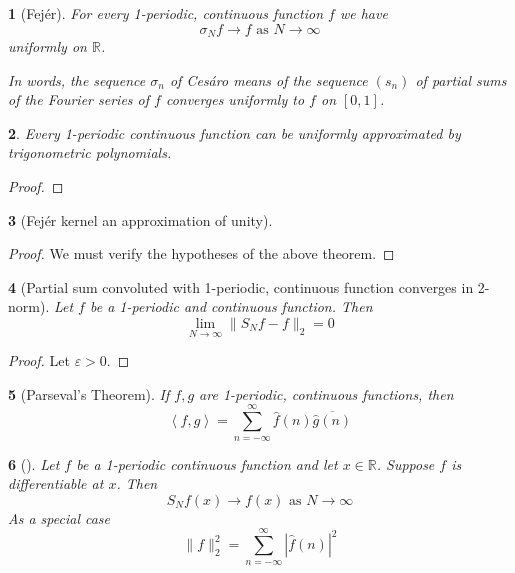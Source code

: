 \documentclass[11pt]{article}
\numberwithin{equation}{section}
\theoremstyle{plain}
\newtheorem{theorem}{\color{ForestGreen}{\textbf{Theorem}}}[section]
\newtheorem{corollary}[theorem]{\color{ForestGreen}{\textbf{Corollary}}}
\theoremstyle{definition}
\newcommand\angles[1]{\left\langle #1 \right\rangle}
\newcommand\abs[1]{\left| #1 \right|}
\newcommand\norm[1]{\lVert#1\rVert}
\newcommand{\1}{\mathbbm 1}
\newcommand{\e}{\varepsilon}
\newcommand{\RR}{\mathbb R}
\begin{document}
\begin{theorem}[Fej\'er]
	For every 1-periodic, continuous function $f$ we have
	\begin{equation}
		\sigma_N f \to f \text{ as } N \to \infty
	\end{equation}
	uniformly on $\RR$. 

	In words, the sequence $\sigma_n$ of Ces\'aro means of the sequence $(s_n)$ of partial sums of the Fourier series of $f$ converges uniformly to $f$ on $[0,1]$.
\end{theorem}

\begin{corollary}
	Every 1-periodic continuous function can be uniformly approximated by trigonometric polynomials. 
\end{corollary}
\begin{proof}
	
\end{proof}



\begin{corollary}[Fej\'er kernel an approximation of unity]

\end{corollary}
\begin{proof}
	We must verify the hypotheses of the above theorem. 

\end{proof}

\begin{theorem}[Partial sum convoluted with 1-periodic, continuous function converges in 2-norm]
	Let $f$ be a 1-periodic and continuous function. Then
	\begin{equation}
		\lim_{N \to \infty} \norm{S_N f - f}_2 = 0
	\end{equation}
\end{theorem}
\begin{proof}
	Let $\e > 0$. 

\end{proof}

\begin{corollary}[Parseval's Theorem]
	If $f,g$ are 1-periodic, continuous functions, then
	\begin{equation}
		\angles{f,g} = \sum_{n=-\infty}^\infty \hat{f}(n) \overline{\hat{g}(n)}
	\end{equation}
\end{corollary}

\begin{theorem}[]
	Let $f$ be a 1-periodic continuous function and let $x \in \RR$. Suppose $f$ is differentiable at $x$. Then 
	\begin{equation}
		S_N f(x) \to f(x) \text{ as } N \to \infty
	\end{equation}
	As a special case
	\begin{equation}
		\norm{f}^2_2 = \sum_{n=-\infty}^\infty \abs{\hat{f}(n)}^2
	\end{equation}
\end{theorem}
\end{document}
